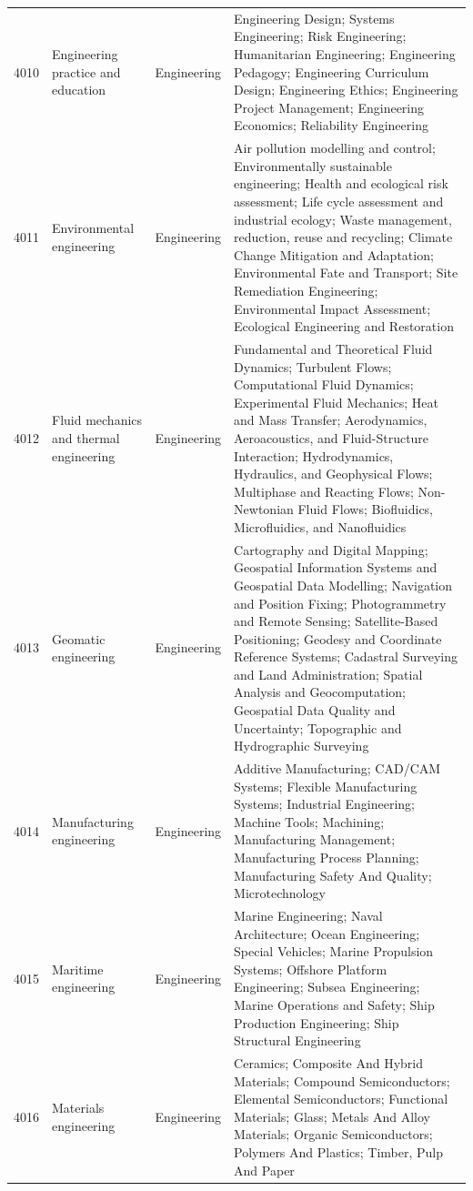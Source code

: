 \begin{longtable}{r p{2.45cm} p{2.55cm} p{6.15cm}}
4010 & Engineering practice and education & Engineering & Engineering Design; Systems Engineering; Risk Engineering; Humanitarian Engineering; Engineering Pedagogy; Engineering Curriculum Design; Engineering Ethics; Engineering Project Management; Engineering Economics; Reliability Engineering \\
4011 & Environmental engineering & Engineering & Air pollution modelling and control; Environmentally sustainable engineering; Health and ecological risk assessment; Life cycle assessment and industrial ecology; Waste management, reduction, reuse and recycling; Climate Change Mitigation and Adaptation; Environmental Fate and Transport; Site Remediation Engineering; Environmental Impact Assessment; Ecological Engineering and Restoration \\
4012 & Fluid mechanics and thermal engineering & Engineering & Fundamental and Theoretical Fluid Dynamics; Turbulent Flows; Computational Fluid Dynamics; Experimental Fluid Mechanics; Heat and Mass Transfer; Aerodynamics, Aeroacoustics, and Fluid-Structure Interaction; Hydrodynamics, Hydraulics, and Geophysical Flows; Multiphase and Reacting Flows; Non-Newtonian Fluid Flows; Biofluidics, Microfluidics, and Nanofluidics \\
4013 & Geomatic engineering & Engineering & Cartography and Digital Mapping; Geospatial Information Systems and Geospatial Data Modelling; Navigation and Position Fixing; Photogrammetry and Remote Sensing; Satellite-Based Positioning; Geodesy and Coordinate Reference Systems; Cadastral Surveying and Land Administration; Spatial Analysis and Geocomputation; Geospatial Data Quality and Uncertainty; Topographic and Hydrographic Surveying \\
4014 & Manufacturing engineering & Engineering & Additive Manufacturing; CAD/CAM Systems; Flexible Manufacturing Systems; Industrial Engineering; Machine Tools; Machining; Manufacturing Management; Manufacturing Process Planning; Manufacturing Safety And Quality; Microtechnology \\
4015 & Maritime engineering & Engineering & Marine Engineering; Naval Architecture; Ocean Engineering; Special Vehicles; Marine Propulsion Systems; Offshore Platform Engineering; Subsea Engineering; Marine Operations and Safety; Ship Production Engineering; Ship Structural Engineering \\
4016 & Materials engineering & Engineering & Ceramics; Composite And Hybrid Materials; Compound Semiconductors; Elemental Semiconductors; Functional Materials; Glass; Metals And Alloy Materials; Organic Semiconductors; Polymers And Plastics; Timber, Pulp And Paper \\

\end{longtable}
